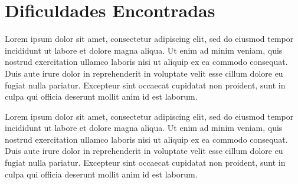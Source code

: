 \section{Dificuldades Encontradas}

	Lorem ipsum dolor sit amet, consectetur adipiscing elit, sed do 
	eiusmod tempor incididunt ut labore et dolore magna aliqua. Ut 
	enim ad minim veniam, quis nostrud exercitation ullamco laboris 
	nisi ut aliquip ex ea commodo consequat. Duis aute irure dolor in 
	reprehenderit in voluptate velit esse cillum dolore eu fugiat 
	nulla pariatur. Excepteur sint occaecat cupidatat non proident, 
	sunt in culpa qui officia deserunt mollit anim id est laborum.

	Lorem ipsum dolor sit amet, consectetur adipiscing elit, sed do 
	eiusmod tempor incididunt ut labore et dolore magna aliqua. Ut 
	enim ad minim veniam, quis nostrud exercitation ullamco laboris 
	nisi ut aliquip ex ea commodo consequat. Duis aute irure dolor in 
	reprehenderit in voluptate velit esse cillum dolore eu fugiat 
	nulla pariatur. Excepteur sint occaecat cupidatat non proident, 
	sunt in culpa qui officia deserunt mollit anim id est laborum.

